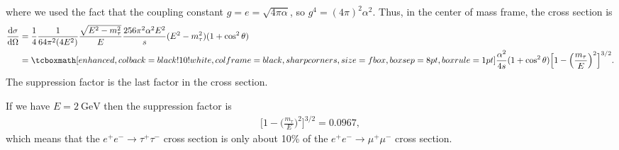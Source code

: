 where we used the fact that the coupling constant $g = e = \sqrt{4 \pi \alpha}$, so $g^{4} = (4 \pi)^2 \alpha^2$.
Thus, in the center of mass frame, the cross section is
\begin{align}
    \label{eq:xsec-etau}
    \dv{\sigma}{\Omega} &= \frac{1}{4} \frac{1}{64 \pi^2 (4E^2)} \frac{\sqrt{E^2 - m_{\tau}^2}}{E} \frac{256 \pi^2 \alpha^2 E^2}{s} (E^2 - m_{\tau}^2)(1 + \cos^2{\theta}) \notag \\
                        &= \eqbox{ \frac{\alpha^2}{4s} (1 + \cos^2{\theta}) \Big[ 1 - \Big(\frac{m_{\tau}}{E} \Big)^2 \Big]^{3/2} }
.\end{align}
The suppression factor is the last factor in the cross section.

If we have $E = \SI{2}{\GeV}$ then the suppression factor is
\begin{eqnarray}
    \label{eq:suppression-factor}
    \Big[ 1 - \Big( \frac{m_{\tau}}{E} \Big)^2 \Big]^{3/2} = 0.0967
,\end{eqnarray}
which means that the $e^{+}e^{-} \rightarrow \tau^{+}\tau^{-}$ cross section is only about 10\% of the $e^{+}e^{-} \rightarrow \mu^{+}\mu^{-}$ cross section.






